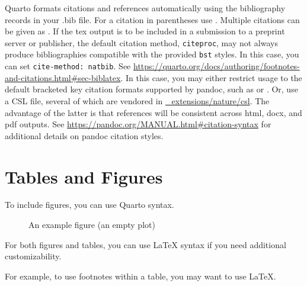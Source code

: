\documentclass[
  sn-nature,
]{sn-jnl}
\begin{document}
Quarto formats citations and references automatically using the
bibliography records in your .bib file. For a citation in parentheses
use \citep{greenwade93}. Multiple citations can be given as
\citep{greenwade93, knuth1984texbook}. If the tex output is to be
included in a submission to a preprint server or publisher, the default
citation method, \texttt{citeproc}, may not always produce
bibliographies compatible with the provided \texttt{bst} styles. In this
case, you can set \texttt{cite-method:\ natbib}. See
\url{https://quarto.org/docs/authoring/footnotes-and-citations.html\#sec-biblatex}.
In this case, you may either restrict usage to the default bracketed key
citation formats supported by pandoc, such as \citep{greenwade93} or
\citep{greenwade93, knuth1984texbook}. Or, use a CSL file, several of
which are vendored in
\href{https://github.com/christopherkenny/nature/tree/main/_extensions/nature/csl}{\_extensions/nature/csl}.
The advantage of the latter is that references will be consistent across
html, docx, and pdf outputs. See
\url{https://pandoc.org/MANUAL.html\#citation-syntax} for additional
details on pandoc citation styles.

\section{Tables and Figures}\label{tables-and-figures}

To include figures, you can use Quarto syntax.

\begin{figure}


\caption{\label{fig-plot}An example figure (an empty plot)}

\end{figure}%

For both figures and tables, you can use LaTeX syntax if you need
additional customizability.

For example, to use footnotes within a table, you may want to use LaTeX.
\end{document}
